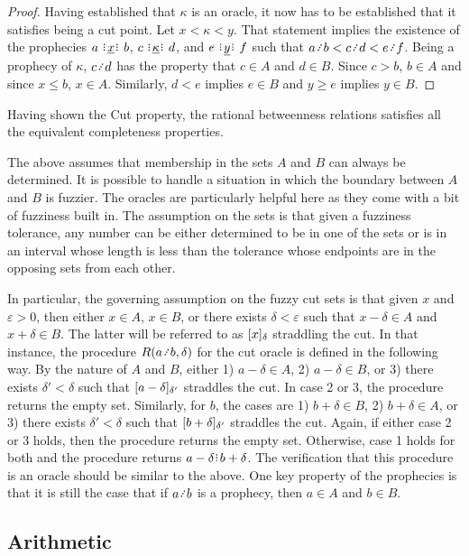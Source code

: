 \documentclass[12pt]{article}
\begin{document}
\begin{proof}
Having established that $\kappa$ is an oracle, it now has to be established that it satisfies being a cut point. Let $x < \kappa < y$. That statement implies the existence of the prophecies $a \xrel b$, $c \xrel[\kappa] d$, and $ e \xrel[y] f$ such that $a \lte b < c \lte d < e \lte f$. Being a prophecy of $\kappa$, $c \lte d$ has the property that $c \in A$ and $d \in B$. Since $c > b$, $b \in A$ and since $x \leq b$, $x \in A$. Similarly, $d < e$ implies $e \in B$ and $y \geq e$ implies $y \in B$.

\end{proof}

Having shown the Cut property, the rational betweenness relations satisfies all the equivalent completeness properties. 

The above assumes that membership in the sets $A$ and $B$ can always be determined. It is possible to handle a situation in which the boundary between $A$ and $B$ is fuzzier. The oracles are particularly helpful here as they come with a bit of fuzziness built in. The assumption on the sets is that given a fuzziness tolerance, any number can be either determined to be in one of the sets or is in an interval whose length is less than the tolerance whose endpoints are in the opposing sets from each other. 

In particular, the governing assumption on the fuzzy cut sets is that given $x$ and $\varepsilon >0$, then either $x \in A$, $x \in B$, or there exists $\delta< \varepsilon$ such that $x-\delta \in A$ and $x + \delta \in B$. The latter will be referred to as $\halo{x}$ straddling the cut. In that instance, the procedure $R(a \lte b, \delta)$ for the cut oracle is defined in the following way. By the nature of $A$ and $B$, either 1) $a - \delta \in A$, 2) $a - \delta \in B$, or 3) there exists $\delta' < \delta$ such that $\halo[\delta']{a-\delta}$ straddles the cut. In case 2 or 3, the procedure returns the empty set. Similarly, for $b$, the cases are 1) $b + \delta \in B$, 2) $b+\delta \in A$, or 3) there exists $\delta' < \delta$ such that $\halo[\delta']{b+\delta}$ straddles the cut. Again, if either case 2 or 3 holds, then the procedure returns the empty set. Otherwise, case 1 holds for both and the procedure returns $a-\delta\rint b+\delta$. The verification that this procedure is an oracle should be similar to the above. One key property of the prophecies is that it is still the case that if $a \lte b$ is a prophecy, then $a \in A$ and $b \in B$.


\subsection{Arithmetic}
\end{document}
